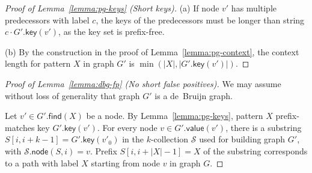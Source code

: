 \documentclass[a4paper,UKenglish]{lipics-v2016}
\newcommand{\abs}[1]{\ensuremath{\lvert #1 \rvert}}
\newcommand{\find}{\ensuremath{\mathsf{find}}}
\newcommand{\gkey}{\ensuremath{\mathsf{key}}}
\newcommand{\gvalue}{\ensuremath{\mathsf{value}}}
\newcommand{\gnode}{\ensuremath{\mathsf{node}}}
\newcommand{\kcollection}[1]{$#1$\nobreakdash-collection}
\begin{document}
\begin{proof}[Proof of Lemma~\ref{lemma:pg-keys} (Short keys)]
(a) If node $v'$ has multiple predecessors with label $c$, the keys of the predecessors must be longer than string $c \cdot G'.\gkey(v')$, as the key set is prefix-free.

(b) By the construction in the proof of Lemma~\ref{lemma:pg-context}, the context length for pattern $X$ in graph $G'$ is $\min(\abs{X}, \abs{G'.\gkey(v')})$.
\end{proof}

\begin{proof}[Proof of Lemma~\ref{lemma:dbg-fp} (No short false positives)]
We may assume without loss of generality that graph $G'$ is a de~Bruijn graph.

Let $v' \in G'.\find(X)$ be a node. By Lemma~\ref{lemma:pg-keys}, pattern $X$ prefix-matches key $G'.\gkey(v')$. For every node $v \in G'.\gvalue(v')$, there is a substring $S[i, i+k-1] = G'.\gkey(v'_{0})$ in the \kcollection{k} $\mathcal{S}$ used for building graph $G'$, with $\mathcal{S}.\gnode(S, i) = v$. Prefix $S[i, i+\abs{X}-1] = X$ of the substring corresponds to a path with label $X$ starting from node $v$ in graph $G$.
\end{proof}
\end{document}
